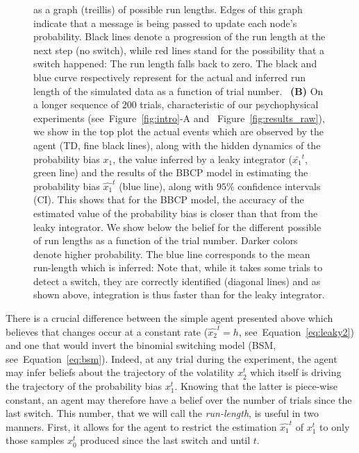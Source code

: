 \documentclass[12pt,english]{article}%
\newcommand{\seeFig}[1]{Figure~\ref{fig:#1}}
\newcommand{\seeEq}[1]{Equation~\ref{eq:#1}}
\begin{document}
\begin{figure}
{as a graph (treillis) of possible run lengths.
Edges of this graph indicate that a message is being passed
to update each node's probability.
Black lines denote a progression of the run length at the next step (no switch),
while red lines stand for the possibility that a switch happened:
The run length falls back to zero.
The black and blue curve respectively represent for
the actual and inferred run length of the simulated data
as a function of trial number.
~\textbf{(B)} On a longer sequence of $200$ trials,
characteristic of our psychophysical experiments (see~\seeFig{intro}-A and ~\seeFig{results_raw}),
we show in the top plot
the actual events which are observed by the agent (TD, fine black lines),
along with the hidden dynamics of the probability bias $x_1$,
the value inferred by a leaky integrator ($\bar{x_1}^t$, green line)
and the results of the BBCP model 
in estimating the probability bias $\hat{x_1}^t$ (blue line),
along with $95\%$ confidence intervals (CI).
This shows that for the BBCP model,
the accuracy of the estimated value of the probability bias
is closer than that from the leaky integrator.
We show below the belief for the different possible of run lengths
as a function of the trial number. 
Darker colors denote higher probability. 
The blue line corresponds to the mean run-length which is inferred:
Note that, while it takes some trials to detect a switch,
they are correctly identified (diagonal lines) and
as shown above, integration is thus faster than for the leaky integrator.
}
\label{fig:bayesianchangepoint}
\end{figure}
There is a crucial difference between the simple agent presented above
which believes that changes occur at a constant rate ($\hat{x_2}^t=h$, see~\seeEq{leaky2})
and one that would invert the binomial switching model (BSM, see~\seeEq{bsm}).
Indeed, at any trial during the experiment,
the agent may infer beliefs about the trajectory of the volatility $x_2^t$
which itself is driving the trajectory of the probability bias $x_1^t$.
Knowing that the latter is piece-wise constant,
an agent may therefore have a belief over the number of trials since the last switch.
This number, that we will call the \emph{run-length}, is useful in two manners.
First, it allows for the agent to restrict the estimation $\hat{x_1}^{t}$ of $x_1^t$
to only those samples $x_0^t$ produced since the last switch and until $t$.
\end{document}
